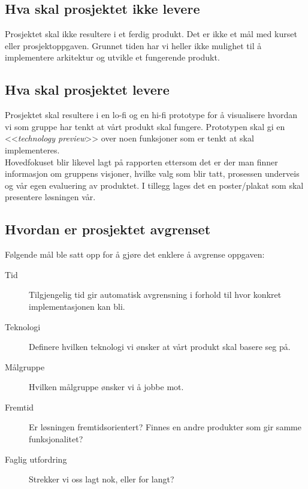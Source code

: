 \subsection{Hva skal prosjektet ikke levere}
Prosjektet skal ikke resultere i et ferdig produkt. Det er ikke et mål med kurset eller prosjektoppgaven. Grunnet tiden har vi heller ikke mulighet til å implementere arkitektur og utvikle et fungerende produkt.

\subsection{Hva skal prosjektet levere}
Prosjektet skal resultere i en lo-fi og en hi-fi prototype for å visualisere hvordan vi som gruppe har tenkt at vårt produkt skal fungere. Prototypen skal gi en <<\textit{technology preview}>> over noen funksjoner som er tenkt at skal implementeres. \\
Hovedfokuset blir likevel lagt på rapporten ettersom det er der man finner informasjon om gruppens visjoner, hvilke valg som blir tatt, prosessen underveis og vår egen evaluering av produktet. I tillegg lages det en poster/plakat som skal presentere løsningen vår.

\subsection{Hvordan er prosjektet avgrenset}
Følgende mål ble satt opp for å gjøre det enklere å avgrense oppgaven:
\begin{description}
\item[Tid] Tilgjengelig tid gir automatisk avgrensning i forhold til hvor konkret implementasjonen kan bli.
\item[Teknologi] Definere hvilken teknologi vi ønsker at vårt produkt skal basere seg på.
\item[Målgruppe] Hvilken målgruppe ønsker vi å jobbe mot.
\item[Fremtid] Er løsningen fremtidsorientert? Finnes en andre produkter som gir samme funksjonalitet?
\item[Faglig utfordring] Strekker vi oss lagt nok, eller for langt?

\end{description}

